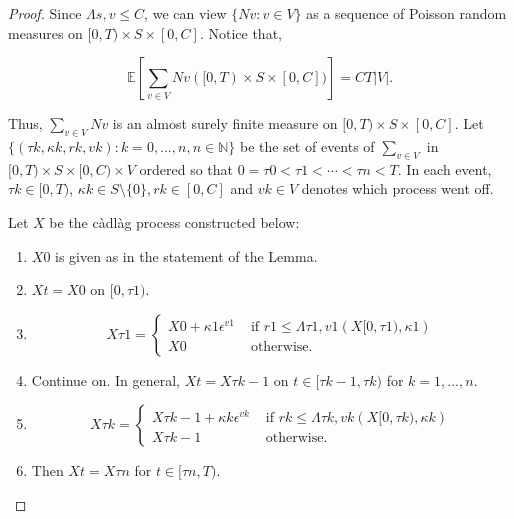 \documentclass[12pt]{article}
\newcommand{\mb}{\mathbb}
\newcommand{\te}{\text}
\newcommand{\ep}{\epsilon}
\newcommand{\ind}{\hspace{24pt}}
\newcommand{\ex}[1]{\mb{E}\left[#1\right]}			%
\renewcommand{\v}{v}							%
\renewcommand{\S}{S}							%
\newcommand{\ev}{\ep}							%
\newcommand{\T}{T}								%
\renewcommand{\t}{t}							%
\renewcommand{\tt}{s}							%
\newcommand{\X}{X}								%
\newcommand{\vind}[1]{^{#1}}					%
\newcommand{\const}{C}							%
\newcommand{\poiss}{N}							%
\renewcommand{\r}{r}							%
\newcommand{\rt}{\tau}							%
\renewcommand{\it}{k}							%
\renewcommand{\mark}{\kappa}					%
\newcommand{\ratee}{\Lambda}					%
\begin{document}
\begin{proof}
Since \(\ratee{\tt,\v} \leq \const{}\), we can view \(\{\poiss{\v}:\v\in V\}\) as a sequence of Poisson random measures on \([0,\T)\times \S\times [0,\const{}]\). Notice that,

\[\ex{\sum_{\v\in V}\poiss{\v}([0,\T)\times\S\times[0,\const{}])} = \const{}\T|V|.\]

Thus, \(\sum_{\v\in V}\poiss{\v}\) is an almost surely finite measure on \([0,\T)\times \S\times [0,\const{}]\). Let \(\{(\rt{\it},\mark{\it},\r{\it},\v{\it}):\it = 0,\dots,n, n\in \mb{N}\}\) be the set of events of \(\sum_{\v\in V}\) in \([0,\T)\times\S\times [0,\const{})\times V\) ordered so that \(0=\rt{0} < \rt{1} < \cdots < \rt{n} < \T\). In each event, \(\rt{\it} \in [0,\T)\), \(\mark{\it}\in \S\setminus\{0\}, \r{\it} \in [0,\const{}]\) and \(\v{\it} \in V\) denotes which process went off.

\ind Let \(\X{}{}\) be the c\`adl\`ag process constructed below:

\begin{enumerate}
\item \(\X{}{0}\) is given as in the statement of the Lemma.

\item \(\X{}{\t} = \X{}{0}\) on \([0,\rt{1})\).

\item 

\[\X{}{\rt{1}} = \begin{cases}
\X{}{0} + \mark{1}\ev\vind{\v{1}} &\te{ if } \r{1} \leq \ratee{\rt{1},\v{1}}(\X{}{[0,\rt{1})},\mark{1})\\
\X{}{0} &\te{ otherwise.}
\end{cases}
\] 

\item Continue on. In general, \(\X{}{\t} = \X{}{\rt{\it-1}}\) on \(\t \in [\rt{\it-1},\rt{\it})\) for \(\it= 1,\dots,n\).

\item 

\[\X{}{\rt{\it}} = \begin{cases}
\X{}{\rt{\it-1}} + \mark{\it}\ev\vind{\v{\it}} &\te{ if } \r{\it} \leq \ratee{\rt{\it},\v{\it}}(\X{}{[0,\rt{\it})},\mark{\it})\\
\X{}{\rt{\it-1}} &\te{ otherwise.}
\end{cases}\]

\item Then \(\X{}{\t} = \X{}{\rt{n}}\) for \(\t\in [\rt{n},\T)\).
\end{enumerate}


\end{proof}
\end{document}
